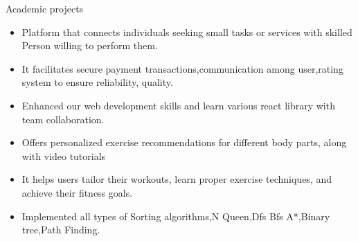 \documentclass{resume} %
\begin{document}
\begin{workSection}{Academic projects}
     \customItem[
        title=Micro-Job marketplace\href{https://microjob-marketplace.onrender.com/}{\textbf{\textcolor{blue}{Link}}},
        duration=May 2023-present,
        keyHighlight=Collaborated in a team of three to design & build a MERN stack web app 
]
     \begin{itemize}
        \vspace{-0.5em}
        \itemsep -6pt {} 
        \item Platform that connects individuals seeking small tasks or services with skilled Person willing to perform them.
        \item It facilitates secure payment transactions,communication among user,rating system to ensure reliability, quality.
     \end{itemize}
\customItem[
title=Fitness Website\href{https://excersise-app.netlify.app/}{\textbf{\textcolor{blue}{Link}}},
duration=Fall 2022,
keyHighlight=Build a Perfect Gym Companion website using various Rapid Apis like Exercise DB and youtube search api.
]
 \begin{itemize}
\vspace{-0.5em}
\itemsep -6pt{}
\item 
Enhanced our web development skills and learn various react library with team collaboration.
\item Offers personalized exercise recommendations for different body parts, along with video tutorials
\item It helps users tailor their workouts, learn proper exercise techniques, and achieve their fitness goals.
 \end{itemize}





     \customItem[
        title=Algorithm Visualizer\href{https://shivam201483101.github.io/Landing/}{\textbf{\textcolor{blue}{Link}}},
        duration=Spring 2022,
        keyHighlight=Led team of three to design and develop an Algorithm Visualizer.       
     ]
     \begin{itemize}
        \vspace{-0.5em}
        \itemsep -6pt {} 
        \item Implemented all types of  Sorting algorithms{,}N Queen{,}Dfs Bfs A*{,}Binary tree{,}Path Finding.
     \end{itemize}
\end{workSection}
\end{document}
